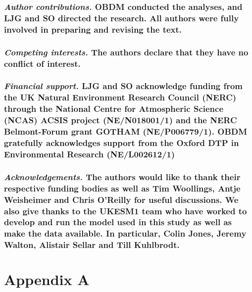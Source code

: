 \documentclass[wcd, manuscript]{copernicus}
\begin{document}
\subsubsection*{\normalsize\normalfont\textit{Author contributions. } OBDM conducted the analyses, and LJG and SO directed the research. All authors were fully involved in preparing and revising the text.}

\subsubsection*{\normalsize\normalfont\textit{Competing interests. }The authors declare that they have no conflict of interest.}

\subsubsection*{\normalsize\normalfont\textit{Financial support. }LJG and SO acknowledge funding from the UK Natural Environment Research Council (NERC) through the National Centre for Atmospheric Science (NCAS) ACSIS project (NE/N018001/1) and the NERC Belmont-Forum grant GOTHAM (NE/P006779/1). OBDM gratefully acknowledges support from the Oxford DTP in Environmental Research (NE/L002612/1)}

\subsubsection*{\normalsize\normalfont\textit{Acknowledgements. }The authors would like to thank their respective funding bodies as well as Tim Woollings, Antje Weisheimer and Chris O'Reilly for useful discussions. We also give thanks to the UKESM1 team who have worked to develop and run the model used in this study as well as make the data available. In particular, Colin Jones, Jeremy Walton, Alistair Sellar and Till Kuhlbrodt.}



 

\newpage
\section{Appendix A}
\appendix
\appendixfigures  %
\end{document}
